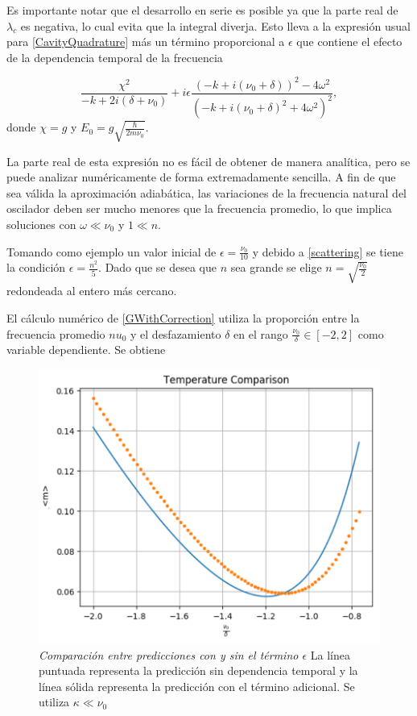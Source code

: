 \documentclass[10pt,a4paper]{report}
\begin{document}
Es importante notar que el desarrollo en serie es posible ya que la parte real de $\lambda_c$ es negativa, lo cual evita que la integral diverja. Esto lleva a la expresión usual para \ref{CavityQuadrature} más un término proporcional a $\epsilon$ que contiene el efecto de la dependencia temporal de la frecuencia

\begin{equation}\label{GWithCorrection}
 \frac{\chi^2}{-k + 2i(\delta + \nu_0)} +i\epsilon\frac{(-k + i(\nu_0 + \delta))^2 - 4\omega^2}{(-k + i(\nu_0 + \delta)^2 + 4\omega^2)^2},
\end{equation} donde $\chi = g$ y $ E_0 = g \sqrt{\frac{\hbar}{2m\nu_0}}$.

La parte real de esta expresión no es fácil de obtener de manera
analítica, pero se puede analizar numéricamente de forma
extremadamente sencilla. A fin de que sea válida la aproximación
adiabática, las variaciones de la frecuencia natural del oscilador
deben ser mucho menores que la frecuencia promedio, lo que
implica soluciones con $\omega \ll \nu_0$ y $1 \ll n$.

Tomando como ejemplo un valor inicial de $\epsilon = \frac{\nu_0}{10}$ y debido a \ref{scattering} se tiene la condición
$\epsilon = \frac{n^2}{5}$. Dado que se desea que $n$ sea grande se
elige $n=\sqrt{\frac{\nu_0}{2}}$ redondeada al entero más cercano.


El cálculo numérico de \eqref{GWithCorrection} utiliza la proporción entre la frecuencia promedio $nu_0$ y
el desfazamiento $\delta$ en el rango
$\frac{\nu_0}{\delta} \in [-2,2]$ como variable dependiente. Se obtiene

\begin{figure}[h!]
\includegraphics[scale=.80]{GraficaTemp.pdf} 
\caption{\textit{Comparación entre predicciones con y sin el término $\epsilon$} La línea puntuada representa la predicción sin dependencia temporal y la línea sólida representa la predicción con el término adicional.  Se utiliza $\kappa \ll \nu_0$}
\label{GraficaEnfriamiento}
\end{figure}
\end{document}

